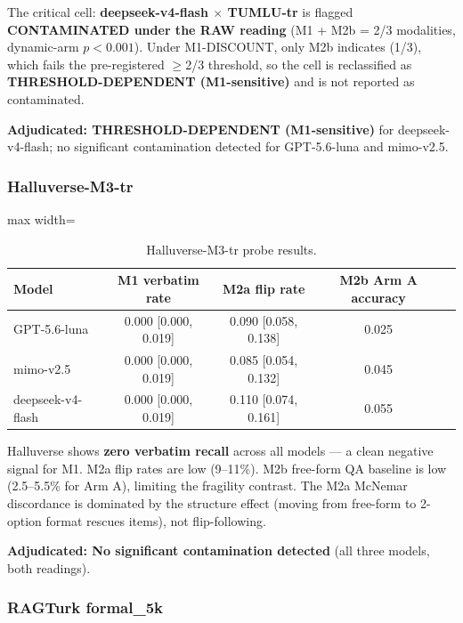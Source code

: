 \documentclass[11pt]{article}
\begin{document}
The critical cell: \textbf{deepseek-v4-flash $\times$ TUMLU-tr} is flagged \textbf{CONTAMINATED under the RAW reading} (M1 + M2b = 2/3 modalities, dynamic-arm $p{<}0.001$). Under M1-DISCOUNT, only M2b indicates (1/3), which fails the pre-registered $\geq$2/3 threshold, so the cell is reclassified as \textbf{THRESHOLD-DEPENDENT (M1-sensitive)} and is not reported as contaminated.

\textbf{Adjudicated: THRESHOLD-DEPENDENT (M1-sensitive)} for deepseek-v4-flash; no significant contamination detected for GPT-5.6-luna and mimo-v2.5.

\subsubsection{Halluverse-M3-tr}

\begin{table}[t]
\centering
\begin{adjustbox}{max width=\textwidth}
\begin{tabular}{lcccc}
\toprule
\textbf{Model} & \textbf{M1 verbatim rate} & \textbf{M2a flip rate} & \textbf{M2b Arm A accuracy} \\
\midrule
GPT-5.6-luna & 0.000 [0.000, 0.019] & 0.090 [0.058, 0.138] & 0.025 \\
mimo-v2.5 & 0.000 [0.000, 0.019] & 0.085 [0.054, 0.132] & 0.045 \\
deepseek-v4-flash & 0.000 [0.000, 0.019] & 0.110 [0.074, 0.161] & 0.055 \\
\bottomrule
\end{tabular}%
\end{adjustbox}
\caption{Halluverse-M3-tr probe results.}
\label{tab:halluverse}
\end{table}

Halluverse shows \textbf{zero verbatim recall} across all models --- a clean negative signal for M1. M2a flip rates are low (9--11\%). M2b free-form QA baseline is low (2.5--5.5\% for Arm A), limiting the fragility contrast. The M2a McNemar discordance is dominated by the structure effect (moving from free-form to 2-option format rescues items), not flip-following.

\textbf{Adjudicated: No significant contamination detected} (all three models, both readings).

\subsubsection{RAGTurk formal\_5k}
\end{document}

